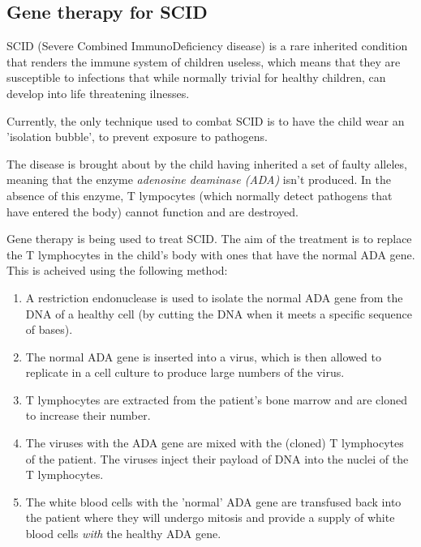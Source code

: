 \documentclass{article}
\begin{document}
\subsection*{Gene therapy for SCID}

SCID (Severe Combined ImmunoDeficiency disease) is a rare inherited condition
that renders the immune system of children useless, which means that they are
susceptible to infections that while normally trivial for healthy children, can
develop into life threatening ilnesses.

Currently, the only technique used to combat SCID is to have the child wear an
'isolation bubble', to prevent exposure to pathogens.

The disease is brought about by the child having inherited a set of faulty
alleles, meaning that the enzyme {\it adenosine deaminase (ADA)} isn't produced.
In the absence of this enzyme, T lympocytes (which normally detect pathogens
that have entered the body) cannot function and are destroyed.

Gene therapy is being used to treat SCID. The aim of the treatment is to replace
the T lymphocytes in the child's body with ones that have the normal ADA gene.
This is acheived using the following method:

\begin{enumerate}

	\item A restriction endonuclease is used to isolate the normal ADA gene from
	the DNA of a healthy cell (by cutting the DNA when it meets a specific
	sequence of bases).

	\item The normal ADA gene is inserted into a virus, which is then allowed to
	replicate in a cell culture to produce large numbers of the virus.

	\item T lymphocytes are extracted from the patient's bone marrow and are
	cloned to increase their number.

	\item The viruses with the ADA gene are mixed with the (cloned) T
	lymphocytes of the patient. The viruses inject their payload of DNA into
	the nuclei of the T lymphocytes.

	\item The white blood cells with the 'normal' ADA gene are transfused back
	into the patient where they will undergo mitosis and provide a supply of
	white blood cells {\it with} the healthy ADA gene.

\end{enumerate}
\end{document}
